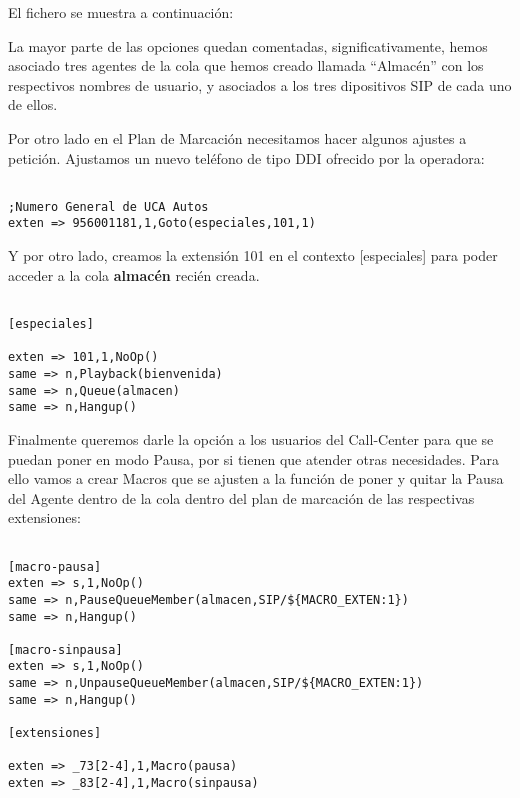 El fichero se muestra a continuación:



La mayor parte de las opciones quedan comentadas, significativamente, hemos asociado tres agentes de la cola que hemos creado llamada ``Almacén'' con los respectivos nombres de usuario, y asociados a los tres dipositivos SIP de cada uno de ellos.

Por otro lado en el Plan de Marcación necesitamos hacer algunos ajustes a petición. Ajustamos un nuevo teléfono de tipo DDI ofrecido por la operadora:

\begin{lstlisting}[style=bash,title={/etc/asterisk/extensions.conf}]

;Numero General de UCA Autos
exten => 956001181,1,Goto(especiales,101,1)

\end{lstlisting}

Y por otro lado, creamos la extensión 101 en el contexto [especiales] para poder acceder a la cola \textbf{almacén} recién creada.

\begin{lstlisting}[style=bash,title={/etc/asterisk/extensions.conf}]

[especiales]

exten => 101,1,NoOp()
same => n,Playback(bienvenida)
same => n,Queue(almacen)
same => n,Hangup()

\end{lstlisting}

Finalmente queremos darle la opción a los usuarios del Call-Center para que se puedan poner en modo Pausa, por si tienen que atender otras necesidades.
Para ello vamos a crear Macros que se ajusten a la función de poner y quitar la Pausa del Agente dentro de la cola dentro del plan de marcación de las respectivas extensiones:

\begin{lstlisting}[style=bash,title={/etc/asterisk/extensions.conf}]

[macro-pausa]
exten => s,1,NoOp()
same => n,PauseQueueMember(almacen,SIP/${MACRO_EXTEN:1})
same => n,Hangup()

[macro-sinpausa]
exten => s,1,NoOp()
same => n,UnpauseQueueMember(almacen,SIP/${MACRO_EXTEN:1})
same => n,Hangup()

[extensiones]

exten => _73[2-4],1,Macro(pausa)
exten => _83[2-4],1,Macro(sinpausa)

\end{lstlisting}

